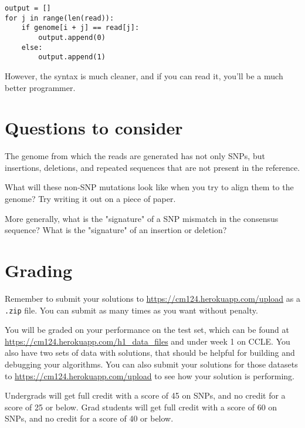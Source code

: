 \documentclass{article}
\begin{document}
\begin{verbatim}
output = []
for j in range(len(read)):
	if genome[i + j] == read[j]:
		output.append(0)
	else:
		output.append(1)
\end{verbatim}

However, the syntax is much cleaner, and if you can read it, you'll be a much better programmer.

\section*{Questions to consider}
The genome from which the reads are generated has not only SNPs, but insertions, deletions, and repeated sequences that are not present in the reference. 

What will these non-SNP mutations look like when you try to align them to the genome? Try writing it out on a piece of paper. 

More generally, what is the "signature" of a SNP mismatch in the consensus sequence?  What is the "signature" of an insertion or deletion?




\section*{Grading}

Remember to submit your solutions to \url{https://cm124.herokuapp.com/upload} as a \verb|.zip| file. You can submit as many times as you want without penalty.

You will be graded on your performance on the test set, which can be found at \url{https://cm124.herokuapp.com/h1_data_files} and under week 1 on CCLE. You also have two sets of data with solutions, that should be helpful for building and debugging your algorithms. You can also submit your solutions for those datasets to \url{https://cm124.herokuapp.com/upload} to see how your solution is performing.

Undergrads will get full credit with a score of 45 on SNPs, and no credit for a score of 25 or below.  Grad students will get full credit with a score of 60 on SNPs, and no credit for a score of 40 or below.
\end{document}
